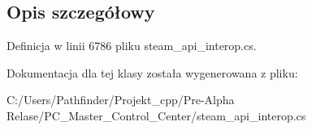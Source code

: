 \subsection{Opis szczegółowy}


Definicja w linii 6786 pliku steam\+\_\+api\+\_\+interop.\+cs.



Dokumentacja dla tej klasy została wygenerowana z pliku\+:\begin{DoxyCompactItemize}
\item 
C\+:/\+Users/\+Pathfinder/\+Projekt\+\_\+cpp/\+Pre-\/\+Alpha Relase/\+P\+C\+\_\+\+Master\+\_\+\+Control\+\_\+\+Center/steam\+\_\+api\+\_\+interop.\+cs\end{DoxyCompactItemize}
